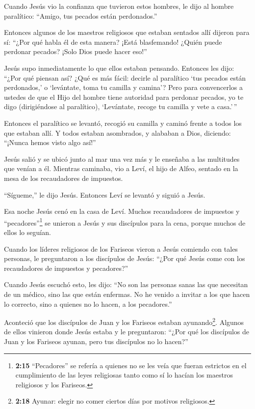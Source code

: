  Cuando Jesús vio la confianza que tuvieron estos hombres,
le dijo al hombre paralítico: ``Amigo, tus pecados están perdonados.''

 Entonces algunos de los maestros religiosos que estaban
sentados allí dijeron para sí:  ``¿Por qué habla él de esta
manera? ¡Está blasfemando! ¿Quién puede perdonar pecados? ¡Solo Dios
puede hacer eso!''

 Jesús supo inmediatamente lo que ellos estaban pensando.
Entonces les dijo: ``¿Por qué piensan así?  ¿Qué es más
fácil: decirle al paralítico `tus pecados están perdonados,' o
`levántate, toma tu camilla y camina'?  Pero para
convencerlos a ustedes de que el Hijo del hombre tiene autoridad para
perdonar pecados,  yo te digo (dirigiéndose al paralítico),
`Levántate, recoge tu camilla y vete a casa.'\,''

 Entonces el paralítico se levantó, recogió su camilla y
caminó frente a todos los que estaban allí. Y todos estaban asombrados,
y alababan a Dios, diciendo: ``¡Nunca hemos visto algo así!''

 Jesús salió y se ubicó junto al mar una vez más y le
enseñaba a las multitudes que venían a él.  Mientras
caminaba, vio a Leví, el hijo de Alfeo, sentado en la mesa de los
recaudadores de impuestos.

``Sígueme,'' le dijo Jesús. Entonces Leví se levantó y siguió a Jesús.

 Esa noche Jesús cenó en la casa de Leví. Muchos
recaudadores de impuestos y ``pecadores''\footnote{\textbf{2:15}
  ``Pecadores'' se refería a quienes no se les veía que fueran estrictos
  en el cumplimiento de las leyes religiosas tanto como sí lo hacían los
  maestros religiosos y los Fariseos.} se unieron a Jesús y sus
discípulos para la cena, porque muchos de ellos lo seguían.

 Cuando los líderes religiosos de los Fariseos vieron a
Jesús comiendo con tales personas, le preguntaron a los discípulos de
Jesús: ``¿Por qué Jesús come con los recaudadores de impuestos y
pecadores?''

 Cuando Jesús escuchó esto, les dijo: ``No son las personas
sanas las que necesitan de un médico, sino las que están enfermas. No he
venido a invitar a los que hacen lo correcto, sino a quienes no lo
hacen, a los pecadores.''

 Aconteció que los discípulos de Juan y los Fariseos
estaban ayunando\footnote{\textbf{2:18} Ayunar: elegir no comer ciertos
  días por motivos religiosos.}. Algunos de ellos vinieron donde Jesús
estaba y le preguntaron: ``¿Por qué los discípulos de Juan y los
Fariseos ayunan, pero tus discípulos no lo hacen?''

